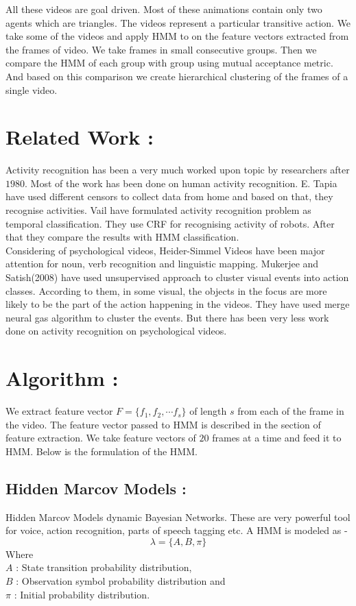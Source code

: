 \documentclass[11pt]{report}
\begin{document}
All these videos are goal driven. Most of these animations contain only two agents which are triangles. The videos represent a particular transitive action. We take some of the videos and apply HMM to on the feature vectors extracted from the frames of video. We take frames in small consecutive groups. Then we compare the HMM of each group with  group using mutual acceptance metric. And based on this comparison we create hierarchical clustering of the frames of a single video.   


\section*{Related Work :}
Activity recognition has been a very much worked upon topic by researchers after $1980$. Most of the work has been done on human activity recognition. E. Tapia \cite{TapiaIL04} have used different censors to collect data from home and based on that, they recognise activities. Vail \cite{VailVL07} have formulated activity recognition problem as temporal classification. They use CRF for recognising activity of robots. After that they compare the results with HMM classification.\\
\hspace*{10pt} Considering of psychological videos, Heider-Simmel Videos \cite{heider} have been major attention for noun, verb recognition and linguistic mapping. Mukerjee and Satish(2008)\cite{satish-mukerjee-2008icdl} have used unsupervised approach to cluster visual events into action classes. According to them, in some visual, the objects in the focus are more likely to be the part of the action happening in the videos. They have used merge neural gas algorithm to cluster the events. But there has been very less work done on activity recognition on psychological videos. 
\section*{Algorithm :} We extract feature vector $F =  \{f_1, f_2, \cdots f_s \}$ of length $s$ from each of the  frame in the video. The feature vector passed to HMM is described in the section of feature extraction. We take feature vectors of $20$ frames at a time and feed it to HMM. Below is the formulation of the HMM.\\
\subsection*{Hidden Marcov Models :}
	Hidden Marcov Models dynamic Bayesian Networks. These are very powerful tool for voice, action recognition\cite{Rabiner89atutorial}, parts of speech tagging etc. A HMM is modeled as  - 
	$$\lambda = \{ A, B, \pi \}$$ 
	Where \\
	\hspace*{30pt} $A$ : State transition probability distribution,\\
	\hspace*{30pt} $B$ : Observation symbol probability distribution and \\
	\hspace*{30pt} $\pi$ : Initial probability distribution.\\ 
\end{document}
